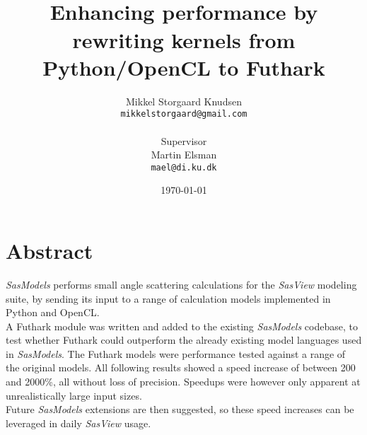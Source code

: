 \documentclass[11pt]{article}
\title{
  \vspace{3cm}
  \Huge{\futhark}\\
  \Large{Enhancing performance by rewriting kernels from Python/OpenCL to
    Futhark}
}
\author{
  \Large{Mikkel Storgaard Knudsen}\\
  \texttt{mikkelstorgaard@gmail.com}\\
  \\
  \Large{Supervisor}\\
  Martin Elsman\\
  \texttt{mael@di.ku.dk}
}
\date{
    \today
}
\def \ColourPDF {include/ku-farve}
\def \TitlePDF   {include/ku-en}  %
\newcommand{\sasmodels}{\textit{SasModels}}
\newcommand{\sasview}{\textit{SasView}}
\begin{document}


\clearpage\maketitle
\thispagestyle{empty}
\clearpage
\section*{Abstract}
\sasmodels{} performs small angle scattering calculations for the \sasview{}
modeling suite, by sending its input to a range of calculation models
implemented in Python and OpenCL. 
\\
A Futhark module was written and added to the 
existing \sasmodels{} codebase, to test whether Futhark could outperform the 
already existing model languages used in \sasmodels{}. The Futhark models
were performance tested against a range of the original models.
All following results showed a speed increase of between 200 and 2000\%, 
all without loss of precision.  Speedups were however only apparent at 
unrealistically large input sizes.
\\
Future \sasmodels{} extensions are then suggested, so these speed increases can be 
leveraged in daily \sasview{} usage.

\newpage
\end{document}

